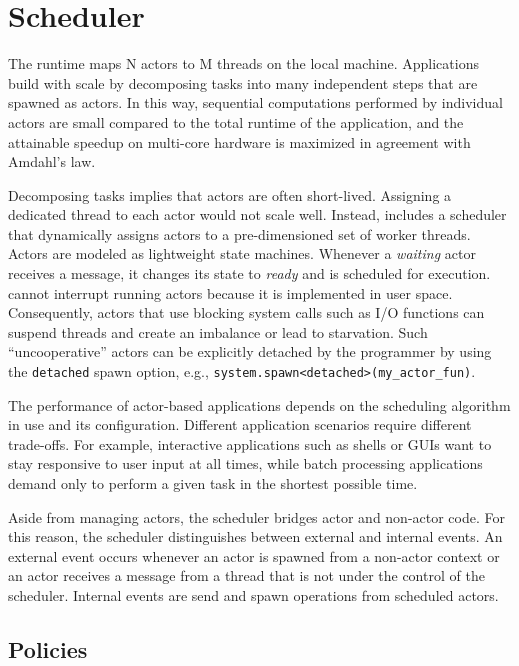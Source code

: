 \section{Scheduler}
\label{scheduler}

The \lib runtime maps N actors to M threads on the local machine. Applications build with \lib scale by decomposing tasks into many independent steps that are spawned as actors. In this way, sequential computations performed by individual actors are small compared to the total runtime of the application, and the attainable speedup on multi-core hardware is maximized in agreement with Amdahl's law.

Decomposing tasks implies that actors are often short-lived. Assigning a dedicated thread to each actor would not scale well. Instead, \lib includes a scheduler that dynamically assigns actors to a pre-dimensioned set of worker threads. Actors are modeled as lightweight state machines. Whenever a \emph{waiting} actor receives a message, it changes its state to \emph{ready} and is scheduled for execution. \lib cannot interrupt running actors because it is implemented in user space. Consequently, actors that use blocking system calls such as I/O functions can suspend threads and create an imbalance or lead to starvation. Such ``uncooperative'' actors can be explicitly detached by the programmer by using the \lstinline^detached^ spawn option, e.g., \lstinline^system.spawn<detached>(my_actor_fun)^.

The performance of actor-based applications depends on the scheduling algorithm in use and its configuration. Different application scenarios require different trade-offs. For example, interactive applications such as shells or GUIs want to stay responsive to user input at all times, while batch processing applications demand only to perform a given task in the shortest possible time.

Aside from managing actors, the scheduler bridges actor and non-actor code. For this reason, the scheduler distinguishes between external and internal events. An external event occurs whenever an actor is spawned from a non-actor context or an actor receives a message from a thread that is not under the control of the scheduler. Internal events are send and spawn operations from scheduled actors.

\subsection{Policies}
\label{scheduler-policy}


